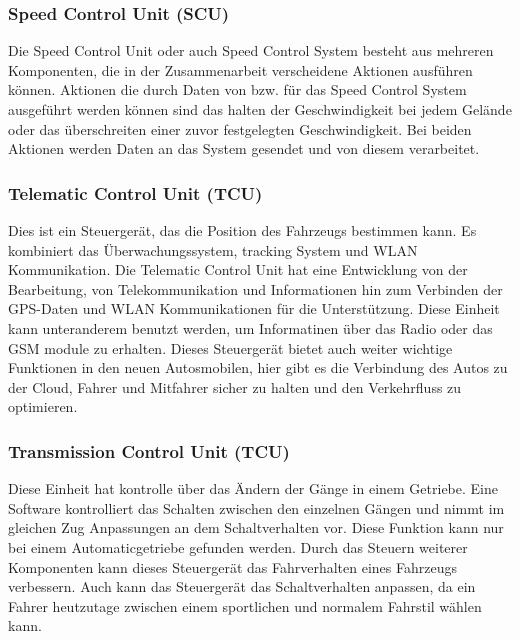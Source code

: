         \subsubsection{Speed Control Unit (SCU)}
        Die Speed Control Unit oder auch Speed Control System besteht aus mehreren Komponenten, die in der Zusammenarbeit
        verscheidene Aktionen ausführen können. Aktionen die durch Daten von bzw. für das Speed Control System ausgeführt
        werden können sind das halten der Geschwindigkeit bei jedem Gelände oder das überschreiten einer zuvor festgelegten
        Geschwindigkeit. Bei beiden Aktionen werden Daten an das System gesendet und von diesem verarbeitet.
        ~\cite{SCU.PB1}

        \subsubsection{Telematic Control Unit (TCU)}
        Dies ist ein Steuergerät, das die Position des Fahrzeugs bestimmen kann. Es kombiniert das Überwachungssystem,
        tracking System und WLAN Kommunikation. Die Telematic Control Unit hat eine Entwicklung von der Bearbeitung, von
        Telekommunikation und Informationen hin zum Verbinden der GPS-Daten und WLAN Kommunikationen für die Unterstützung.
        Diese Einheit kann unteranderem benutzt werden, um Informatinen über das Radio oder das GSM module zu erhalten.
        Dieses Steuergerät bietet auch weiter wichtige Funktionen in den neuen Autosmobilen, hier gibt es die Verbindung
        des Autos zu der Cloud, Fahrer und Mitfahrer sicher zu halten und den Verkehrfluss zu optimieren.
        ~\cite{telematiccontrol.PB1} ~\cite{telematiccontrol.PB2} ~\cite{telematiccontrol.PB3}

        \subsubsection{Transmission Control Unit (TCU)}
        Diese Einheit hat kontrolle über das Ändern der Gänge in einem Getriebe. Eine Software kontrolliert das Schalten
        zwischen den einzelnen Gängen und nimmt im gleichen Zug Anpassungen an dem Schaltverhalten vor. Diese Funktion kann
        nur bei einem Automaticgetriebe gefunden werden. Durch das Steuern weiterer Komponenten kann dieses Steuergerät das
        Fahrverhalten eines Fahrzeugs verbessern. Auch kann das Steuergerät das Schaltverhalten anpassen, da ein Fahrer
        heutzutage zwischen einem sportlichen und normalem Fahrstil wählen kann.
        ~\cite{transmissioncontrol.PB1} ~\cite{transmissioncontrol.PB2}


